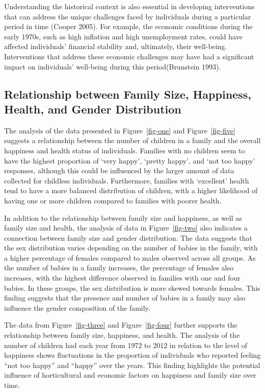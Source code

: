 \documentclass[
  letterpaper,
  DIV=11,
  numbers=noendperiod]{scrartcl}
\begin{document}
Understanding the historical context is also essential in developing
interventions that can address the unique challenges faced by
individuals during a particular period in time (Cooper 2005). For
example, the economic conditions during the early 1970s, such as high
inflation and high unemployment rates, could have affected individuals'
financial stability and, ultimately, their well-being. Interventions
that address these economic challenges may have had a significant impact
on individuals' well-being during this period(Brunstein 1993).

\hypertarget{relationship-between-family-size-happiness-health-and-gender-distribution}{%
\subsection{Relationship between Family Size, Happiness, Health, and
Gender
Distribution}\label{relationship-between-family-size-happiness-health-and-gender-distribution}}

The analysis of the data presented in Figure~\ref{fig-one} and
Figure~\ref{fig-five} suggests a relationship between the number of
children in a family and the overall happiness and health status of
individuals. Families with no children seem to have the highest
proportion of `very happy', `pretty happy', and `not too happy'
responses, although this could be influenced by the larger amount of
data collected for childless individuals. Furthermore, families with
`excellent' health tend to have a more balanced distribution of
children, with a higher likelihood of having one or more children
compared to families with poorer health.

In addition to the relationship between family size and happiness, as
well as family size and health, the analysis of data in
Figure~\ref{fig-two} also indicates a connection between family size and
gender distribution. The data suggests that the sex distribution varies
depending on the number of babies in the family, with a higher
percentage of females compared to males observed across all groups. As
the number of babies in a family increases, the percentage of females
also increases, with the highest difference observed in families with
one and four babies. In these groups, the sex distribution is more
skewed towards females. This finding suggests that the presence and
number of babies in a family may also influence the gender composition
of the family.

The data from Figure~\ref{fig-three} and Figure~\ref{fig-four} further
supports the relationship between family size, happiness, and health.
The analysis of the number of children had each year from 1972 to 2012
in relation to the level of happiness shows fluctuations in the
proportion of individuals who reported feeling ``not too happy'' and
``happy'' over the years. This finding highlights the potential
influence of horticultural and economic factors on happiness and family
size over time.
\end{document}
